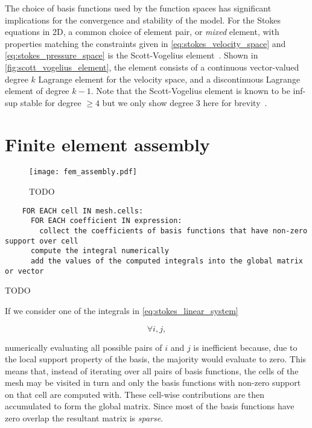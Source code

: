 \documentclass[thesis]{subfiles}
\begin{document}
The choice of basis functions used by the function spaces has significant implications for the convergence and stability of the model.
For the Stokes equations in 2D, a common choice of element pair, or \textit{mixed} element, with properties matching the constraints given in \cref{eq:stokes_velocity_space} and \cref{eq:stokes_pressure_space} is the Scott-Vogelius element~\cite{scottNormEstimatesMaximal1985}.
Shown in \cref{fig:scott_vogelius_element}, the element consists of a continuous vector-valued degree $k$ Lagrange element for the velocity space, and a discontinuous Lagrange element of degree $k-1$.
Note that the Scott-Vogelius element is known to be inf-sup stable for degree $\geq 4$ but we only show degree 3 here for brevity~\cite{guzmanScottVogeliusFiniteElements2018}.

\section{Finite element assembly}

\begin{figure}
  \centering
  \texttt{[image: fem\_assembly.pdf]}
  \caption{TODO}
  \label{fig:fem_assembly}
\end{figure}

\begin{algorithm}
  \begin{verbatim}
    FOR EACH cell IN mesh.cells:
      FOR EACH coefficient IN expression:
        collect the coefficients of basis functions that have non-zero support over cell
      compute the integral numerically
      add the values of the computed integrals into the global matrix or vector
  \end{verbatim}
  \caption{TODO}
  \label{alg:fem_assembly}
\end{algorithm}

If we consider one of the integrals in \cref{eq:stokes_linear_system}

\begin{equation*}
  \forall i, j,
\end{equation*}

numerically evaluating all possible pairs of $i$ and $j$ is inefficient because, due to the local support property of the basis, the majority would evaluate to zero.
This means that, instead of iterating over all pairs of basis functions, the cells of the mesh may be visited in turn and only the basis functions with non-zero support on that cell are computed with.
These cell-wise contributions are then accumulated to form the global matrix.
Since most of the basis functions have zero overlap the resultant matrix is \textit{sparse}.
\end{document}
